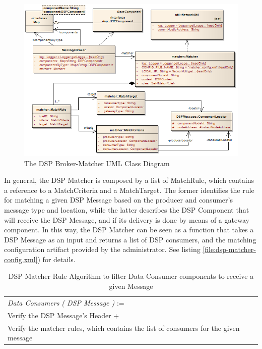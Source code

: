 \begin{figure}[!b]
  \centering
  \includegraphics[scale=0.6]{../diagrams/DSPBroker-Matcher-Class-Diagram}
  \caption{The DSP Broker-Matcher UML Class Diagram}
  \label{fig:DSPBroker-Matcher-Class-Diagram}
\end{figure}

In general, the DSP Matcher is composed by a list of MatchRule, which contains
a reference to a MatchCriteria and a MatchTarget. The former identifies the
rule for matching a given DSP Message based on the producer and consumer's
message type and location, while the latter describes the DSP Component that
will receive the DSP Message, and if its delivery is done by means of a gateway
component. In this way, the DSP Matcher can be seen as a function that takes a
DSP Message as an input and returns a list of DSP consumers, and the
matching configuration artifact provided by the administrator. See listing
\ref{file:dsp-matcher-config.xml}) for details.

\begin{table}
    \caption{DSP Matcher Rule Algorithm to filter Data Consumer components to
    receive a given Message}
    \begin{center}
        \begin{tabular}{lr}
          \textit{Data Consumers ( DSP Message )} := \\ 
          Verify the DSP Message's Header + \\
          Verify the matcher rules, which contains the list of consumers for
          the given message
        \end{tabular}
    \end{center}
    \label{tab:ysi-data-stream}
\end{table}

